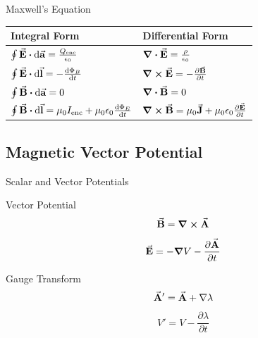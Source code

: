 \documentclass{beamer}
\begin{document}
\begin{frame}{Maxwell's Equation}
    \begin{table}[htbp]
        \centering
        \begin{tabular}{ll}
            \toprule
            Integral Form                                                                         & Differential Form                                              \\
            \midrule
            $\oint \va{E}\vdot\dd{\va{a}}=\frac{Q_{\text{enc}}}{\epsilon_0}$                      & $\div{\va{E}} = \frac{\rho}{\epsilon_0}$                       \\ \addlinespace
            $\oint \va{E}\vdot\dd{\va{l}}= -\dv{\Phi_B}{t}$                                       & $\curl{\va{E}}=-\pdv{\va{B}}{t}$                               \\ \addlinespace
            $\oint \va{B}\vdot\dd{\va{a}}=0$                                                      & $\div{\va{B}} = 0$                                             \\ \addlinespace
            $\oint \va{B}\vdot\dd{\va{l}}=\mu_0 I_{\text{enc}} + \mu_0 \epsilon_0 \dv{\Phi_E}{t}$ & $\curl{\va{B}}=\mu_0 \va{J}+ \mu_0 \epsilon_0 \pdv{\va{E}}{t}$ \\
            \bottomrule
        \end{tabular}
    \end{table}
\end{frame}

\subsection{Magnetic Vector Potential}

\begin{frame}{Scalar and Vector Potentials}
    \begin{block}{Vector Potential}
        \begin{equation}
            \va{B} = \curl \va{A}
        \end{equation}
        \begin{equation}
            \va{E} = -\grad V - \pdv{\va{A}}{t}
        \end{equation}
    \end{block}

    \begin{block}{Gauge Transform}
        \begin{equation}
            \va{A}'=\va{A}+\nabla \lambda
        \end{equation}
        \begin{equation}
            V'=V-\frac{\partial \lambda}{\partial t}
        \end{equation}
    \end{block}
\end{frame}
\end{document}
